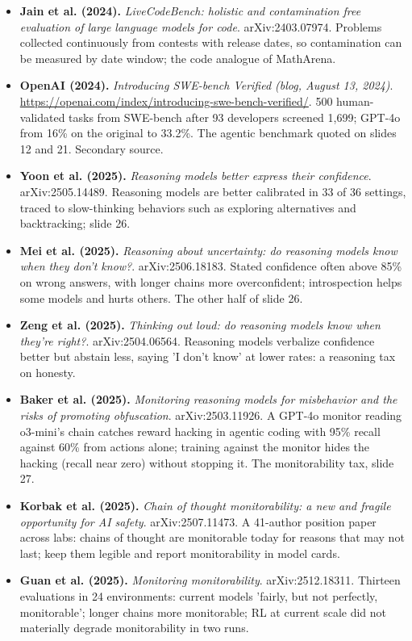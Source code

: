 \documentclass[11pt,letterpaper]{article}
\begin{document}
\begin{itemize}[leftmargin=1.2em,itemsep=3pt]
\item \textbf{Jain et al. (2024).} \textit{LiveCodeBench: holistic and contamination free evaluation of large language models for code}. arXiv:2403.07974. Problems collected continuously from contests with release dates, so contamination can be measured by date window; the code analogue of MathArena.
\item \textbf{OpenAI (2024).} \textit{Introducing SWE-bench Verified (blog, August 13, 2024)}. \url{https://openai.com/index/introducing-swe-bench-verified/}. 500 human-validated tasks from SWE-bench after 93 developers screened 1,699; GPT-4o from 16\% on the original to 33.2\%. The agentic benchmark quoted on slides 12 and 21. Secondary source.
\item \textbf{Yoon et al. (2025).} \textit{Reasoning models better express their confidence}. arXiv:2505.14489. Reasoning models are better calibrated in 33 of 36 settings, traced to slow-thinking behaviors such as exploring alternatives and backtracking; slide 26.
\item \textbf{Mei et al. (2025).} \textit{Reasoning about uncertainty: do reasoning models know when they don't know?}. arXiv:2506.18183. Stated confidence often above 85\% on wrong answers, with longer chains more overconfident; introspection helps some models and hurts others. The other half of slide 26.
\item \textbf{Zeng et al. (2025).} \textit{Thinking out loud: do reasoning models know when they're right?}. arXiv:2504.06564. Reasoning models verbalize confidence better but abstain less, saying 'I don't know' at lower rates: a reasoning tax on honesty.
\item \textbf{Baker et al. (2025).} \textit{Monitoring reasoning models for misbehavior and the risks of promoting obfuscation}. arXiv:2503.11926. A GPT-4o monitor reading o3-mini's chain catches reward hacking in agentic coding with 95\% recall against 60\% from actions alone; training against the monitor hides the hacking (recall near zero) without stopping it. The monitorability tax, slide 27.
\item \textbf{Korbak et al. (2025).} \textit{Chain of thought monitorability: a new and fragile opportunity for AI safety}. arXiv:2507.11473. A 41-author position paper across labs: chains of thought are monitorable today for reasons that may not last; keep them legible and report monitorability in model cards.
\item \textbf{Guan et al. (2025).} \textit{Monitoring monitorability}. arXiv:2512.18311. Thirteen evaluations in 24 environments: current models 'fairly, but not perfectly, monitorable'; longer chains more monitorable; RL at current scale did not materially degrade monitorability in two runs.

\end{itemize}
\end{document}

